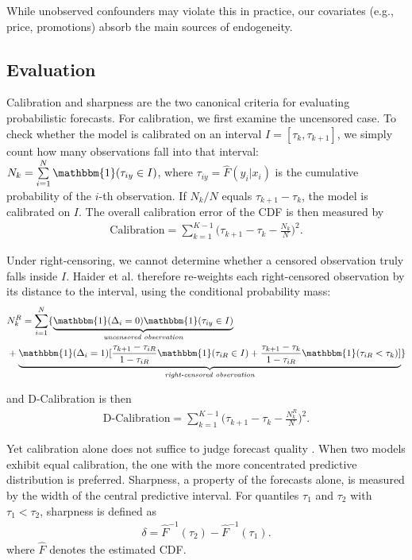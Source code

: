 \documentclass[sigconf]{acmart}
\begin{document}
While unobserved confounders may violate this in practice, 
our covariates (e.g., price, promotions) absorb the main 
sources of endogeneity.

\subsection{Evaluation}

Calibration and sharpness are the two canonical criteria for evaluating probabilistic forecasts. For calibration, we first examine the uncensored case. To check whether the model is calibrated on an interval $I = [\tau_k, \tau_{k+1}]$, we simply count how many observations fall into that interval: $N_k = \sum\limits_{i=1}^{N}\mathbbm{1}(\tau_{iy} \in I)$, where $\tau_{iy} = \hat{F}(y_i|x_i)$ is the cumulative probability of the $i$-th observation. If $N_k / N$ equals $\tau_{k+1} - \tau_k$, the model is calibrated on $I$.  The overall calibration error of the CDF is then measured by
\begin{align*}
\text{Calibration}= \sum_{k=1}^{K-1}\bigl(\tau_{k+1}-\tau_k-\tfrac{N_k}{N}\bigr)^2.
\end{align*}

Under right-censoring, we cannot determine whether a censored observation truly falls inside $I$. Haider et al.\citep{haider2020effective} therefore re-weights each right-censored observation by its distance to the interval, using the conditional probability mass:
\begin{align*}
& N^{R}_k = \sum\limits_{i=1}^{N} \{\underbrace{\mathbbm{1}(\Delta_i =0)\mathbbm{1}(\tau_{iy} \in I)}_{\textit{uncensored observation}} \\
& + \underbrace{\mathbbm{1}(\Delta_i = 1)[\dfrac{\tau_{k+1} - \tau_{iR}}{1 - \tau_{iR}}\mathbbm{1}(\tau_{iR} \in I) + \dfrac{\tau_{k+1}- \tau_{k}}{1 - \tau_{iR}}\mathbbm{1}(\tau_{iR} < \tau_k)]}_{\textit{right-censored observation}}\} 
\end{align*}


and D-Calibration is then
\begin{align*}
\text{D-Calibration}= \sum_{k=1}^{K-1}\bigl(\tau_{k+1}-\tau_k-\tfrac{N^{R}_k}{N}\bigr)^2.
\end{align*}

Yet calibration alone does not suffice to judge forecast quality \citep{gneiting2007strictly}. When two models exhibit equal calibration, the one with the more concentrated predictive distribution is preferred. Sharpness, a property of the forecasts alone, is measured by the width of the central predictive interval. For quantiles $\tau_1$ and $\tau_2$ with $\tau_1 < \tau_2$, sharpness is defined as  
\begin{align*}
\delta = \hat{F}^{-1}(\tau_2) - \hat{F}^{-1}(\tau_1).
\end{align*}
where $\hat{F}$ denotes the estimated CDF.
\end{document}
